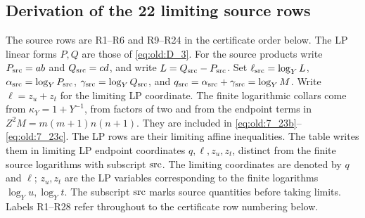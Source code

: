 \subsection*{Derivation of the 22 limiting source rows}
The source rows are R1--R6 and R9--R24 in the certificate order
below. The LP linear forms \(P,Q\) are those of \eqref{eq:old:D_3}. For the
source products write \(P_{\rm src}=ab\) and \(Q_{\rm src}=cd\), and
write \(L=Q_{\rm src}-P_{\rm src}\). Set
\(\ell_{\rm src}=\log_Y L\),
\(\alpha_{\rm src}=\log_Y P_{\rm src}\),
\(\gamma_{\rm src}=\log_Y Q_{\rm src}\), and
\(q_{\rm src}=\alpha_{\rm src}+\gamma_{\rm src}=\log_Y M\).
Write \(\ell=z_u+z_t\) for the limiting LP coordinate. The finite logarithmic collars come from
\(\kappa_Y=1+Y^{-1}\), from factors of two and from the endpoint terms in
\(Z^2M=m(m+1)n(n+1)\). They are included in
\eqref{eq:old:7_23b}--\eqref{eq:old:7_23c}. The LP rows are their
limiting affine inequalities. The table writes them in limiting LP
endpoint coordinates \(q,\ell,z_u,z_t\), distinct from the finite source
logarithms with subscript \({\rm src}\). The limiting coordinates are
denoted by \(q\) and \(\ell\); \(z_u,z_t\)
are the LP variables corresponding to the finite logarithms
\(\log_Yu,\log_Yt\). The subscript \({\rm src}\) marks source quantities
before taking limits. Labels R1--R28 refer throughout to the certificate
row numbering below.
\small
\unnumtable
